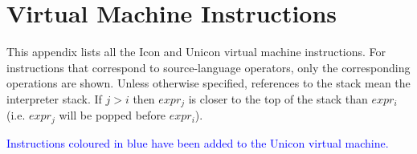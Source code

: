 \chapter{Virtual Machine Instructions}

This appendix lists all the Icon and Unicon virtual machine instructions. For
instructions that correspond to source-language operators, only the
corresponding operations are shown. Unless otherwise specified,
references to the stack mean the interpreter stack.
If $j > i$ then $expr_j$ is closer to the top of the stack than $expr_i$
(i.e. $expr_j$ will be popped before $expr_i$).

\noindent\textcolor{blue}{Instructions coloured in blue have been added to the Unicon
virtual machine.}
\bigskip

\newcommand{\uniconop}[1]{\color{blue} \texttt{#1} & \textcolor{blue}{To be completed}}

\tablehead{}
\tablefirsthead{}
\tabletail{}
\tablelasttail{}

